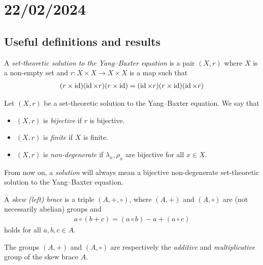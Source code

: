 \documentclass[12pt]{amsproc}
\begin{document}
\maketitle %
\setcounter{section}{1}
\section{22/02/2024}

\subsection{Useful definitions and results}

\begin{definition}
        A \emph{set-theoretic solution to the Yang--Baxter equation} is a pair $(X,r)$ where $X$ is a non-empty set and $r: X\times X \to X \times X$ is a map such that
        \begin{align}\label{eq:YBE}
            (r\times \operatorname{id})(\operatorname{id} \times r)(r\times \operatorname{id}) = (\operatorname{id} \times r)(r\times \operatorname{id})(\operatorname{id} \times r)
        \end{align}
\end{definition}

\begin{definition}
        Let $(X,r)$ be a set-theoretic solution to the  Yang--Baxter equation. We say that 
        \begin{itemize}
            \item $(X,r)$ is \emph{bijective} if $r$ is bijective.
            \item $(X,r)$ is \emph{finite} if $X$ is finite.
            \item $(X,r)$ is \emph{non-degenerate} if $\lambda_x,\rho_x$ are bijective for all $x\in X$.
        \end{itemize}
    \end{definition}

\begin{convention}
        From now on, a \emph{solution}  will always mean a bijective non-degenerate set-theoretic solution to the Yang--Baxter equation.
\end{convention}

\begin{definition}
         A \emph{skew (left) brace} is a triple $(A,+,\circ)$, where 
        $(A,+)$ and $(A,\circ)$ 
    	are (not necessarily abelian) 
    	groups and 
    	\begin{align}\label{compatibility}
    	    a\circ(b+c)=(a\circ b)-a+(a\circ c)
    	\end{align}
    	holds for all $a,b,c\in A$. 
    
    The groups $(A,+)$ and $(A,\circ)$ are respectively the \emph{additive} and \emph{multiplicative} group	of the skew brace $A$.
\end{definition}
\end{document}
